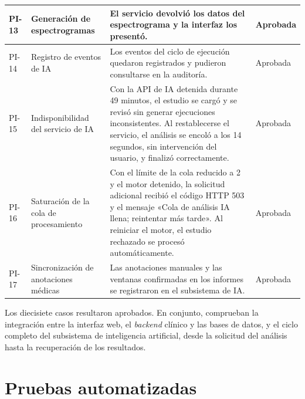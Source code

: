 \begin{nuevotexto}
\begin{longtable}{|p{1.25cm}|p{3.4cm}|p{7.6cm}|p{1.75cm}|}
PI-13 &
Generación de espectrogramas &
El servicio devolvió los datos del espectrograma y la interfaz los presentó. &
Aprobada \\
\hline

PI-14 &
Registro de eventos de IA &
Los eventos del ciclo de ejecución quedaron registrados y pudieron consultarse en la auditoría. &
Aprobada \\
\hline

PI-15 &
Indisponibilidad del servicio de IA &
Con la API de IA detenida durante 49 minutos, el estudio se cargó y se revisó sin generar ejecuciones inconsistentes. Al restablecerse el servicio, el análisis se encoló a los 14 segundos, sin intervención del usuario, y finalizó correctamente. &
Aprobada \\
\hline

PI-16 &
Saturación de la cola de procesamiento &
Con el límite de la cola reducido a 2 y el motor detenido, la solicitud adicional recibió el código HTTP 503 y el mensaje «Cola de análisis IA llena; reintentar más tarde». Al reiniciar el motor, el estudio rechazado se procesó automáticamente. &
Aprobada \\
\hline

PI-17 &
Sincronización de anotaciones médicas &
Las anotaciones manuales y las ventanas confirmadas en los informes se registraron en el subsistema de IA. &
Aprobada \\
\hline

\end{longtable}
\endgroup

Los diecisiete casos resultaron aprobados.
En conjunto, comprueban la integración entre la interfaz web, el \textit{backend} clínico y las bases de datos, y el ciclo completo del subsistema de inteligencia artificial, desde la solicitud del análisis hasta la recuperación de los resultados.
\end{nuevotexto}

\section{Pruebas automatizadas}
\label{sec:pruebas-automatizadas}

